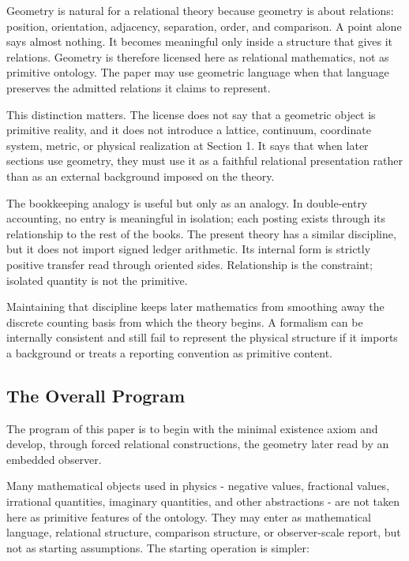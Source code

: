 Geometry is natural for a relational theory because geometry is about relations: position, orientation, adjacency, separation, order, and comparison. A point alone says almost nothing. It becomes meaningful only inside a structure that gives it relations. Geometry is therefore licensed here as relational mathematics, not as primitive ontology. The paper may use geometric language when that language preserves the admitted relations it claims to represent.

This distinction matters. The license does not say that a geometric object is primitive reality, and it does not introduce a lattice, continuum, coordinate system, metric, or physical realization at Section 1. It says that when later sections use geometry, they must use it as a faithful relational presentation rather than as an external background imposed on the theory.

The bookkeeping analogy is useful but only as an analogy. In double-entry accounting, no entry is meaningful in isolation; each posting exists through its relationship to the rest of the books. The present theory has a similar discipline, but it does not import signed ledger arithmetic. Its internal form is strictly positive transfer read through oriented sides. Relationship is the constraint; isolated quantity is not the primitive.

Maintaining that discipline keeps later mathematics from smoothing away the discrete counting basis from which the theory begins. A formalism can be internally consistent and still fail to represent the physical structure if it imports a background or treats a reporting convention as primitive content.

\subsection{The Overall Program}
The program of this paper is to begin with the minimal existence axiom and develop, through forced relational constructions, the geometry later read by an embedded observer.

Many mathematical objects used in physics - negative values, fractional values, irrational quantities, imaginary quantities, and other abstractions - are not taken here as primitive features of the ontology. They may enter as mathematical language, relational structure, comparison structure, or observer-scale report, but not as starting assumptions. The starting operation is simpler:

